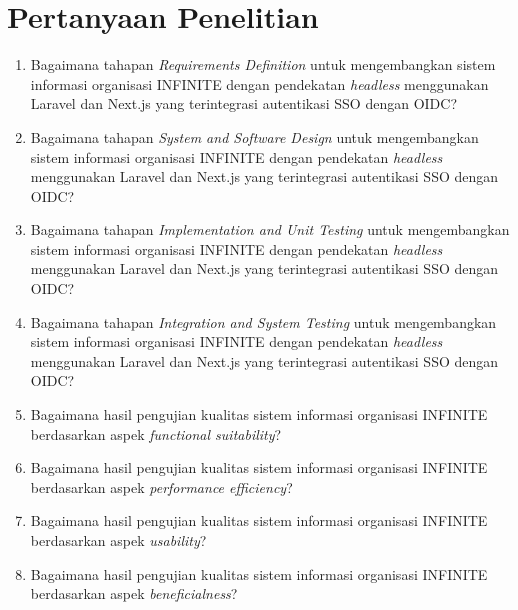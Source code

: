 \begin{figure}[H]
\end{figure}

\section{Pertanyaan Penelitian}

\begin{enumerate}
  \item Bagaimana tahapan \textit{Requirements Definition} untuk mengembangkan sistem informasi organisasi INFINITE dengan pendekatan \textit{headless} menggunakan Laravel dan Next.js yang terintegrasi autentikasi SSO dengan OIDC?
  \item Bagaimana tahapan \textit{System and Software Design} untuk mengembangkan sistem informasi organisasi INFINITE dengan pendekatan \textit{headless} menggunakan Laravel dan Next.js yang terintegrasi autentikasi SSO dengan OIDC?
  \item Bagaimana tahapan \textit{Implementation and Unit Testing} untuk mengembangkan sistem informasi organisasi INFINITE dengan pendekatan \textit{headless} menggunakan Laravel dan Next.js yang terintegrasi autentikasi SSO dengan OIDC?
  \item Bagaimana tahapan \textit{Integration and System Testing} untuk mengembangkan sistem informasi organisasi INFINITE dengan pendekatan \textit{headless} menggunakan Laravel dan Next.js yang terintegrasi autentikasi SSO dengan OIDC?
  \item Bagaimana hasil pengujian kualitas sistem informasi organisasi INFINITE berdasarkan aspek \textit{functional suitability}?
  \item Bagaimana hasil pengujian kualitas sistem informasi organisasi INFINITE berdasarkan aspek \textit{performance efficiency}?
  \item Bagaimana hasil pengujian kualitas sistem informasi organisasi INFINITE berdasarkan aspek \textit{usability}?
  \item Bagaimana hasil pengujian kualitas sistem informasi organisasi INFINITE berdasarkan aspek \textit{beneficialness}?
\end{enumerate}
